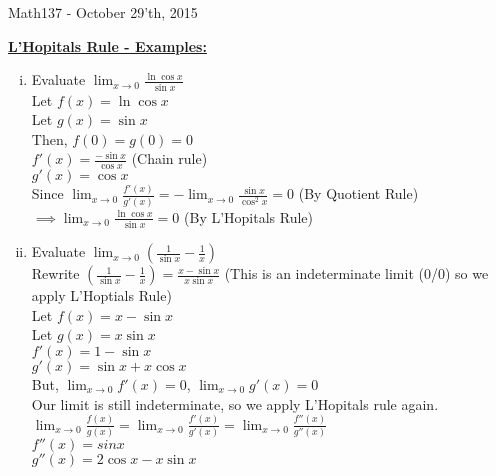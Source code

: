 \documentclass{letter}
\begin{document}
	\begin{center}
		\LARGE Math137 - October 29'th, 2015
	\end{center}
	\vspace{0.25 in}
	\underline{\textbf{L'Hopitals Rule - Examples:}}
	\vspace{0.25 in}
	
	\begin{enumerate}[i)]
		\item Evaluate $\lim_{x \to 0} \frac{\ln{\cos{x}}}{\sin{x}}$\\
		
		Let $f(x) = \ln{\cos{x}}$\\
		Let $g(x) = \sin{x}$\\
		Then, $f(0) = g(0) = 0$\\
		
		$f'(x) = \frac{-\sin{x}}{\cos{x}}$ (Chain rule)\\
		$g'(x) = \cos{x}$\\
		
		Since $\lim_{x \to 0} \frac{f'(x)}{g'(x)} = -\lim_{x \to 0} \frac{\sin{x}}{\cos^2{x}} = 0$ (By Quotient Rule)\\
		$\implies \lim_{x \to 0} \frac{\ln{\cos{x}}}{\sin{x}} = 0$ (By L'Hopitals Rule)\\
		
		\item Evaluate $\lim_{x \to 0} \left( \frac{1}{\sin{x}} - \frac{1}{x} \right)$\\
		
		Rewrite $\left( \frac{1}{\sin{x}} - \frac{1}{x} \right) = \frac{x - \sin{x}}{x \sin{x}}$  (This is an indeterminate limit (0/0) so we apply L'Hoptials Rule)\\
		
		Let $f(x) = x - \sin{x}$\\
		Let $g(x) = x \sin{x}$\\
		$f'(x) = 1 - \sin{x}$\\
		$g'(x) = \sin{x} + x \cos{x}$\\
		
		But, $\lim_{x \to 0} f'(x) = 0$, $\lim_{x \to 0} g'(x) = 0$\\
		Our limit is still indeterminate, so we apply L'Hopitals rule again.\\
		
		$\lim_{x \to 0} \frac{f(x)}{g(x)} = \lim_{x \to 0}\frac{f'(x)}{g'(x)} = \lim_{x \to 0} \frac{f''(x)}{g''(x)}$\\
		
		$f''(x) = sinx$\\
		$g''(x) = 
		2 \cos{x} - x \sin{x}$\\
		

\end{enumerate}
\end{document}
